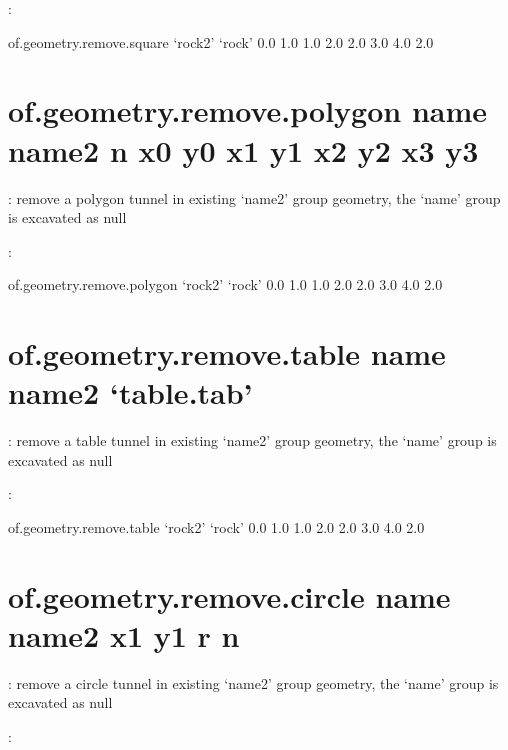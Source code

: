 \documentclass[letterpaper,10pt,english]{sphinxmanual}
\begin{document}
:

\begin{sphinxVerbatim}[commandchars=\\\{\}]
of.geometry.remove.square ‘rock2’ ‘rock’ 0.0 1.0 1.0 2.0 2.0 3.0 4.0 2.0
\end{sphinxVerbatim}


\section{of.geometry.remove.polygon name name2 n x0 y0 x1 y1 x2 y2 x3 y3}
\label{\detokenize{rst_tutorials/command_line_guide:of-geometry-remove-polygon-name-name2-n-x0-y0-x1-y1-x2-y2-x3-y3}}
: remove a polygon tunnel in existing ‘name2’ group geometry, the
‘name’ group is excavated as null

:

\begin{sphinxVerbatim}[commandchars=\\\{\}]
of.geometry.remove.polygon ‘rock2’ ‘rock’ 0.0 1.0 1.0 2.0 2.0 3.0 4.0 2.0
\end{sphinxVerbatim}


\section{of.geometry.remove.table name name2 ‘table.tab’}
\label{\detokenize{rst_tutorials/command_line_guide:of-geometry-remove-table-name-name2-table-tab}}
: remove a table tunnel in existing ‘name2’ group geometry, the
‘name’ group is excavated as null

:

\begin{sphinxVerbatim}[commandchars=\\\{\}]
of.geometry.remove.table ‘rock2’ ‘rock’ 0.0 1.0 1.0 2.0 2.0 3.0 4.0 2.0
\end{sphinxVerbatim}


\section{of.geometry.remove.circle name name2 x1 y1 r n}
\label{\detokenize{rst_tutorials/command_line_guide:of-geometry-remove-circle-name-name2-x1-y1-r-n}}
: remove a circle tunnel in existing ‘name2’ group geometry, the
‘name’ group is excavated as null

:
\end{document}
